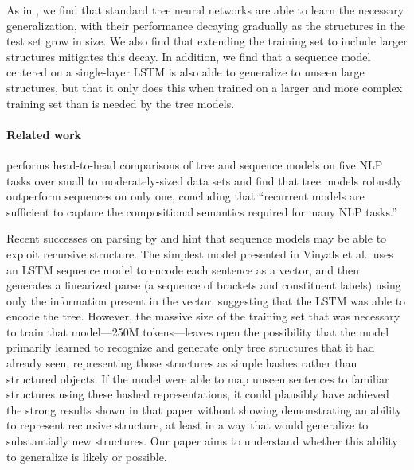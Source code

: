 As in , we find that standard tree neural networks are able to learn the necessary generalization, with their performance decaying gradually as the structures in the test set grow in size. We also find that extending the training set to include larger structures mitigates this decay. In addition, we find that a sequence model centered on a single-layer LSTM is also able to generalize to unseen large structures, but that it only does this when trained on a larger and more complex training set than is needed by the tree models. 

\paragraph{Related work}
 performs head-to-head comparisons of tree and sequence models on five NLP tasks over small to moderately-sized data sets and find that tree models robustly outperform sequences on only one, concluding that ``recurrent models are sufficient to capture the compositional semantics required for many NLP tasks.''

Recent successes on parsing by  and  hint that sequence models may be able to exploit recursive structure. The simplest model presented in Vinyals et al.~uses an LSTM sequence model to encode each sentence as a vector, and then generates a linearized parse (a sequence of brackets and constituent labels) using only the information present in the vector, suggesting that the LSTM was able to encode the tree. However, the massive size of the training set that was necessary to train that model---250M tokens---leaves open the possibility that the model primarily learned to recognize and generate only tree structures that it had already seen, representing those structures as simple hashes rather than structured objects. If the model were able to map unseen sentences to familiar structures using these hashed representations, it could plausibly have achieved the strong results shown in that paper without showing demonstrating an ability to represent recursive structure, at least in a way that would generalize to substantially new structures. Our paper aims to understand whether this ability to generalize is likely or possible.
